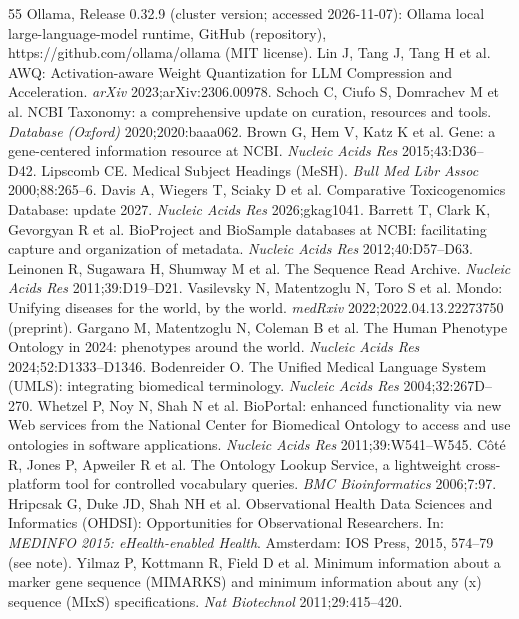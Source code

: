 \documentclass[11pt,a4paper]{article}
\begin{document}
\begin{thebibliography}{55}
Ollama, Release 0.32.9 (cluster version; accessed 2026-11-07): Ollama local large-language-model runtime, GitHub (repository), https://github.com/ollama/ollama (MIT license).
Lin J, Tang J, Tang H et al. AWQ: Activation-aware Weight Quantization for LLM Compression and Acceleration. \emph{arXiv} 2023;arXiv:2306.00978.
Schoch C, Ciufo S, Domrachev M et al. NCBI Taxonomy: a comprehensive update on curation, resources and tools. \emph{Database (Oxford)} 2020;2020:baaa062.
Brown G, Hem V, Katz K et al. Gene: a gene-centered information resource at NCBI. \emph{Nucleic Acids Res} 2015;43:D36–D42.
Lipscomb CE. Medical Subject Headings (MeSH). \emph{Bull Med Libr Assoc} 2000;88:265–6.
Davis A, Wiegers T, Sciaky D et al. Comparative Toxicogenomics Database: update 2027. \emph{Nucleic Acids Res} 2026;gkag1041.
Barrett T, Clark K, Gevorgyan R et al. BioProject and BioSample databases at NCBI: facilitating capture and organization of metadata. \emph{Nucleic Acids Res} 2012;40:D57–D63.
Leinonen R, Sugawara H, Shumway M et al. The Sequence Read Archive. \emph{Nucleic Acids Res} 2011;39:D19–D21.
Vasilevsky N, Matentzoglu N, Toro S et al. Mondo: Unifying diseases for the world, by the world. \emph{medRxiv} 2022;2022.04.13.22273750 (preprint).
Gargano M, Matentzoglu N, Coleman B et al. The Human Phenotype Ontology in 2024: phenotypes around the world. \emph{Nucleic Acids Res} 2024;52:D1333–D1346.
Bodenreider O. The Unified Medical Language System (UMLS): integrating biomedical terminology. \emph{Nucleic Acids Res} 2004;32:267D–270.
Whetzel P, Noy N, Shah N et al. BioPortal: enhanced functionality via new Web services from the National Center for Biomedical Ontology to access and use ontologies in software applications. \emph{Nucleic Acids Res} 2011;39:W541–W545.
Côté R, Jones P, Apweiler R et al. The Ontology Lookup Service, a lightweight cross-platform tool for controlled vocabulary queries. \emph{BMC Bioinformatics} 2006;7:97.
Hripcsak G, Duke JD, Shah NH et al. Observational Health Data Sciences and Informatics (OHDSI): Opportunities for Observational Researchers. In: \emph{MEDINFO 2015: eHealth-enabled Health}. Amsterdam: IOS Press, 2015, 574–79 (see note).
Yilmaz P, Kottmann R, Field D et al. Minimum information about a marker gene sequence (MIMARKS) and minimum information about any (x) sequence (MIxS) specifications. \emph{Nat Biotechnol} 2011;29:415–420.

\end{thebibliography}
\end{document}
